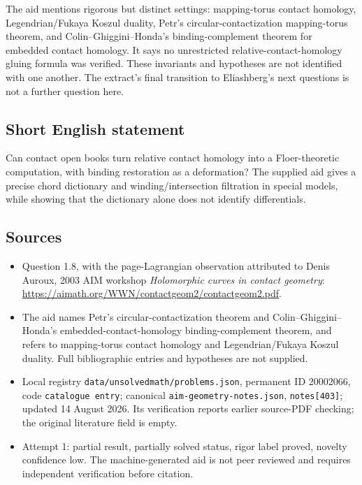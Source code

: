 \documentclass[11pt]{article}
\begin{document}
The aid mentions rigorous but distinct settings: mapping-torus contact homology, Legendrian/Fukaya Koszul duality, Petr's circular-contactization mapping-torus theorem, and Colin--Ghiggini--Honda's binding-complement theorem for embedded contact homology. It says no unrestricted relative-contact-homology gluing formula was verified. These invariants and hypotheses are not identified with one another. The extract's final transition to Eliashberg's next questions is not a further question here.
\subsection{Short English statement}
Can contact open books turn relative contact homology into a Floer-theoretic computation, with binding restoration as a deformation? The supplied aid gives a precise chord dictionary and winding/intersection filtration in special models, while showing that the dictionary alone does not identify differentials.
\subsection{Sources}
\begin{itemize}
\item Question 1.8, with the page-Lagrangian observation attributed to Denis Auroux, 2003 AIM workshop \emph{Holomorphic curves in contact geometry}: \url{https://aimath.org/WWN/contactgeom2/contactgeom2.pdf}.
\item The aid names Petr's circular-contactization theorem and Colin--Ghiggini--Honda's embedded-contact-homology binding-complement theorem, and refers to mapping-torus contact homology and Legendrian/Fukaya Koszul duality. Full bibliographic entries and hypotheses are not supplied.
\item Local registry \texttt{data/unsolvedmath/problems.json}, permanent ID 20002066, code \texttt{catalogue entry}; canonical \texttt{aim-geometry-notes.json}, \texttt{notes[403]}; updated 14 August 2026. Its verification reports earlier source-PDF checking; the original literature field is empty.
\item Attempt 1: partial result, partially solved status, rigor label proved, novelty confidence low. The machine-generated aid is not peer reviewed and requires independent verification before citation.
\end{itemize}
\end{document}
